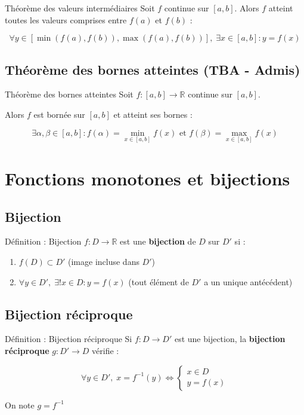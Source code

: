 \documentclass[a4paper,11pt]{article}
\begin{document}
\begin{theorembox}{Théorème des valeurs intermédiaires}
Soit $f$ continue sur $[a, b]$. Alors $f$ atteint toutes les valeurs comprises entre $f(a)$ et $f(b)$ :

\[\forall y \in [\min(f(a), f(b)), \max(f(a), f(b))], \; \exists x \in [a, b] : y = f(x)\]
\end{theorembox}

\subsection{Théorème des bornes atteintes (TBA - Admis)}

\begin{theorembox}{Théorème des bornes atteintes}
Soit $f : [a, b] \to \mathbb{R}$ continue sur $[a, b]$. 

Alors $f$ est bornée sur $[a, b]$ et atteint ses bornes :

\[\exists \alpha, \beta \in [a, b] : f(\alpha) = \min_{x \in [a,b]} f(x) \text{ et } f(\beta) = \max_{x \in [a,b]} f(x)\]
\end{theorembox}

\newpage
\section{Fonctions monotones et bijections}

\subsection{Bijection}

\begin{defbox}{Définition : Bijection}
$f : D \to \mathbb{R}$ est une \textbf{bijection} de $D$ sur $D'$ si :
\begin{enumerate}
    \item $f(D) \subset D'$ (image incluse dans $D'$)
    \item $\forall y \in D', \; \exists! x \in D : y = f(x)$ (tout élément de $D'$ a un unique antécédent)
\end{enumerate}
\end{defbox}

\subsection{Bijection réciproque}

\begin{defbox}{Définition : Bijection réciproque}
Si $f : D \to D'$ est une bijection, la \textbf{bijection réciproque} $g : D' \to D$ vérifie :

\[\forall y \in D', \; x = f^{-1}(y) \Leftrightarrow \begin{cases} x \in D \\ y = f(x) \end{cases}\]

On note $g = f^{-1}$
\end{defbox}
\end{document}
